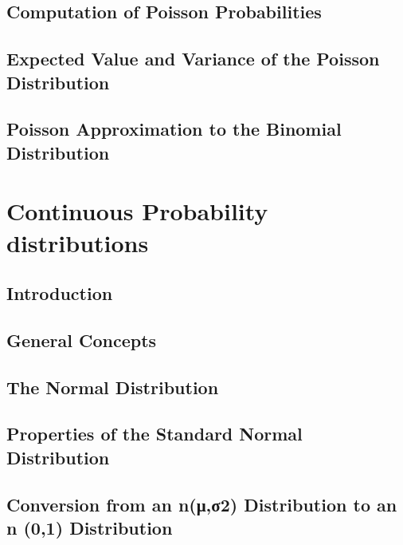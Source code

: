 \documentclass[12pt,]{article}
\theoremstyle{definition}
\theoremstyle{definition}
\theoremstyle{definition}
\theoremstyle{remark}
\begin{document}
\subsection{Computation of Poisson
Probabilities}\label{computation-of-poisson-probabilities}

\subsection{Expected Value and Variance of the Poisson
Distribution}\label{expected-value-and-variance-of-the-poisson-distribution}

\subsection{Poisson Approximation to the Binomial
Distribution}\label{poisson-approximation-to-the-binomial-distribution}

\section{Continuous Probability
distributions}\label{continuous-probability-distributions}

\subsection{Introduction}\label{introduction-2}

\subsection{General Concepts}\label{general-concepts}

\subsection{The Normal Distribution}\label{the-normal-distribution}

\subsection{Properties of the Standard Normal
Distribution}\label{properties-of-the-standard-normal-distribution}

\subsection{Conversion from an n(μ,σ2) Distribution to an n (0,1)
Distribution}\label{conversion-from-an-n2-distribution-to-an-n-01-distribution}
\end{document}
